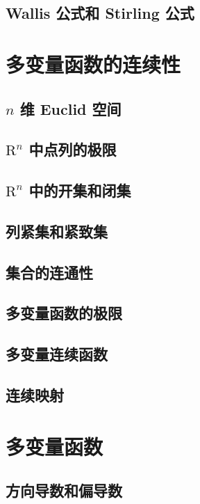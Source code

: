 \documentclass[a4paper, 11pt]{ctexbook}
\begin{document}
        \section{Wallis 公式和 Stirling 公式}
    \chapter{多变量函数的连续性}
        \section{$n$ 维 Euclid 空间}
            
        \section{$\mathrm{R}^n$ 中点列的极限}
            
        \section{$\mathrm{R}^n$ 中的开集和闭集}
            
        \section{列紧集和紧致集}
            
        \section{集合的连通性}
            
        \section{多变量函数的极限}
            
        \section{多变量连续函数}
            
        \section{连续映射}
    \chapter{多变量函数}
        \section{方向导数和偏导数}
            
\end{document}
